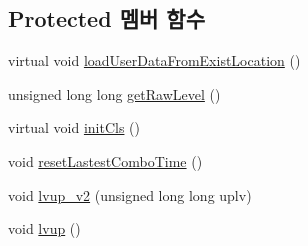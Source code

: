 \subsection*{Protected 멤버 함수}
\begin{DoxyCompactItemize}
\item 
virtual void \hyperlink{class_tetris_1_1_users_1_1_game_user_a730bd78525a4802685b53c67b38eca0c}{load\+User\+Data\+From\+Exist\+Location} ()
\item 
unsigned long long \hyperlink{class_tetris_1_1_users_1_1_game_user_a3e232d2f4a0610e51136bec11453858b}{get\+Raw\+Level} ()
\item 
virtual void \hyperlink{class_tetris_1_1_users_1_1_game_user_a8ec8ca43d0c6d0dc2c2e049ae1b4d316}{init\+Cls} ()
\item 
void \hyperlink{class_tetris_1_1_users_1_1_game_user_a442b35545b13a23dca566cf1b43eb82d}{reset\+Lastest\+Combo\+Time} ()
\item 
void \hyperlink{class_tetris_1_1_users_1_1_game_user_aacc605ed22d2b982a106659ef94fb3c9}{lvup\+\_\+v2} (unsigned long long uplv)
\item 
void \hyperlink{class_tetris_1_1_users_1_1_game_user_ad7bdfbb3fc18ca0a1cdfcb34faaed6ff}{lvup} ()
\end{DoxyCompactItemize}
